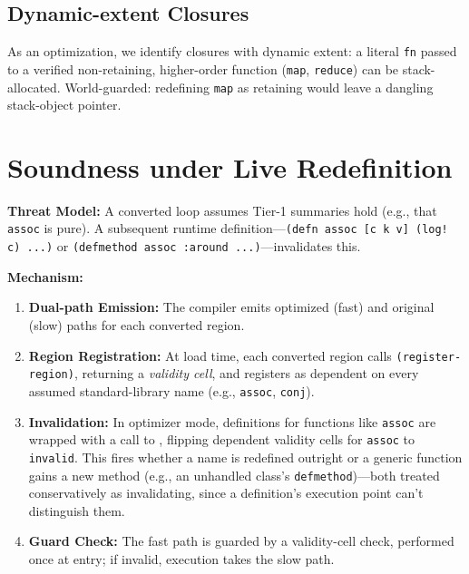 \documentclass[sigplan,review,anonymous]{acmart}
\begin{document}
\subsection{Dynamic-extent Closures}
As an optimization, we identify closures with dynamic extent: a literal \texttt{fn} passed to a verified non-retaining, higher-order function (\texttt{map}, \texttt{reduce}) can be stack-allocated. World-guarded: redefining \texttt{map} as retaining would leave a dangling stack-object pointer.

\section{Soundness under Live Redefinition}
\label{sec:soundness}
\textbf{Threat Model:} A converted loop assumes Tier-1 summaries hold (e.g., that \texttt{assoc} is pure). A subsequent runtime definition---\texttt{(defn assoc [c k v] (log! c) ...)} or \texttt{(defmethod assoc :around ...)}---invalidates this.

\textbf{Mechanism:}
\begin{enumerate}
    \item \textbf{Dual-path Emission:} The compiler emits optimized (fast) and original (slow) paths for each converted region.
    \item \textbf{Region Registration:} At load time, each converted region calls \texttt{(register-region)}, returning a \emph{validity cell}, and registers as dependent on every assumed standard-library name (e.g., \texttt{assoc}, \texttt{conj}).
    \item \textbf{Invalidation:} In optimizer mode, definitions for functions like \texttt{assoc} are wrapped with a call to , flipping dependent validity cells for \texttt{assoc} to \texttt{invalid}. This fires whether a name is redefined outright or a generic function gains a new method (e.g., an unhandled class's \texttt{defmethod})---both treated conservatively as invalidating, since a definition's execution point can't distinguish them.
    \item \textbf{Guard Check:} The fast path is guarded by a validity-cell check, performed once at entry; if invalid, execution takes the slow path.
\end{enumerate}
\end{document}
